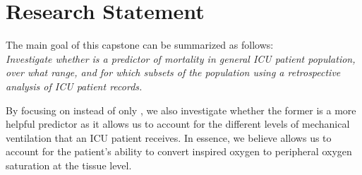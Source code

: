 \section{Research Statement} 

The main goal of this capstone can be summarized as follows: \\
\textit{ Investigate whether \SF is a predictor of mortality in general ICU patient population, over what range, and for which subsets of the population using a retrospective analysis of ICU patient records.
}

By focusing on \SF instead of only \Sp, we also investigate whether the former is a more helpful predictor as it allows us to account for the different levels of mechanical ventilation that an ICU patient receives. In essence, we believe allows us to account for the patient's ability to convert inspired oxygen to peripheral oxygen saturation at the tissue level. 






